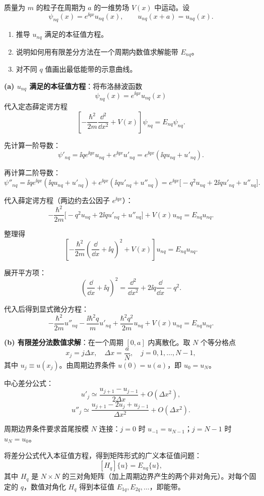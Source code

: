 \begin{question}
质量为 $m$ 的粒子在周期为 $a$ 的一维势场 $V(x)$ 中运动。设
\[
\psi_{nq}(x)=e^{\ii qx}u_{nq}(x),\qquad u_{nq}(x+a)=u_{nq}(x).
\]
\begin{enumerate}
\item 推导 $u_{nq}$ 满足的本征值方程。
\item 说明如何用有限差分方法在一个周期内数值求解能带 $E_{nq}$。
\item 对不同 $q$ 值画出最低能带的示意曲线。
\end{enumerate}
\end{question}
\begin{solution}
	\textbf{(a) $u_{nq}$ 满足的本征值方程}：将布洛赫波函数
	\[
	\psi_{nq}(x)=e^{\ii qx}u_{nq}(x)
	\]
	代入定态薛定谔方程
	\[
	\left[-\frac{\hbar^2}{2m}\frac{\dd^2}{\dd x^2}+V(x)\right]\psi_{nq}=E_{nq}\psi_{nq}.
	\]

	先计算一阶导数：
	\[
	\psi'_{nq}= \ii q e^{\ii qx}u_{nq}+ e^{\ii qx}u'_{nq}=e^{\ii qx}(\ii q u_{nq}+u'_{nq}).
	\]

	再计算二阶导数：
	\[
	\psi''_{nq}= \ii q e^{\ii qx}(\ii q u_{nq}+u'_{nq})+ e^{\ii qx}(\ii q u'_{nq}+u''_{nq})
	=e^{\ii qx}\big[-\!q^2u_{nq}+2\ii q u'_{nq}+u''_{nq}\big].
	\]

	代入薛定谔方程（两边约去公因子 $e^{\ii qx}$）：
	\[
	-\frac{\hbar^2}{2m}\big[-q^2u_{nq}+2\ii q u'_{nq}+u''_{nq}\big]+V(x)u_{nq}=E_{nq}u_{nq}.
	\]

	整理得
	\[
	\left[-\frac{\hbar^2}{2m}\left(\frac{\dd}{\dd x}+\ii q\right)^2+V(x)\right]u_{nq}=E_{nq}u_{nq}.
	\]

	展开平方项：
	\[
	\left(\frac{\dd}{\dd x}+\ii q\right)^2=\frac{\dd^2}{\dd x^2}+2\ii q\frac{\dd}{\dd x}-q^2.
	\]

	代入后得到显式微分方程：
	\[
	-\frac{\hbar^2}{2m}u''_{nq}-\frac{\ii\hbar^2 q}{m}u'_{nq}+\frac{\hbar^2 q^2}{2m}u_{nq}+V(x)u_{nq}=E_{nq}u_{nq}.
	\]

	\textbf{(b) 有限差分法数值求解}：在一个周期 $[0,a]$ 内离散化。取 $N$ 个等分格点
	\[
	x_j=j\Delta x,\quad \Delta x=\frac{a}{N},\quad j=0,1,\ldots,N-1,
	\]
	其中 $u_j\equiv u(x_j)$。由周期边界条件 $u(0)=u(a)$，即 $u_0=u_N$。

	中心差分公式：
	\[
	u'_j\simeq\frac{u_{j+1}-u_{j-1}}{2\Delta x}+O(\Delta x^2),
	\]
	\[
	u''_j\simeq\frac{u_{j+1}-2u_j+u_{j-1}}{\Delta x^2}+O(\Delta x^2).
	\]

	周期边界条件要求首尾按模 $N$ 连接：$j=0$ 时 $u_{-1}=u_{N-1}$；$j=N-1$ 时 $u_N=u_0$。

	将差分公式代入本征值方程，得到矩阵形式的广义本征值问题：
	\[
	[H_q]\{u\}=E_{nq}\{u\},
	\]
	其中 $H_q$ 是 $N\times N$ 的三对角矩阵（加上周期边界产生的两个非对角元）。对每个固定的 $q$，数值对角化 $H_q$ 得到本征值 $E_{1q},E_{2q},\ldots$，即能带。


\end{solution}
